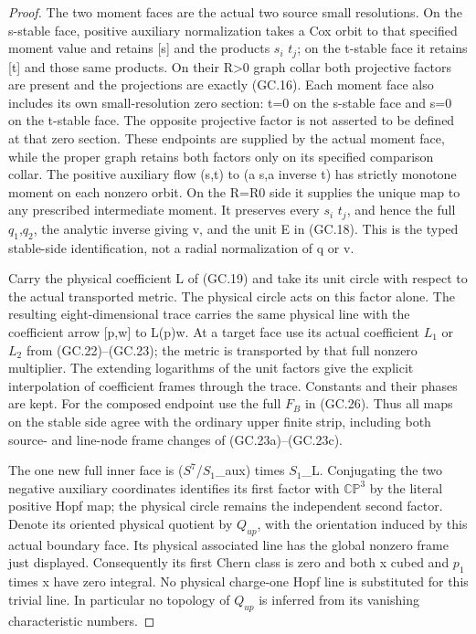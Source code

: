 \begin{proof}
The two moment faces are the actual two source small resolutions.
On the s-stable face, positive auxiliary normalization takes a
Cox orbit to that specified moment value and retains {[}s{]} and the
products \(s_{i}\) \(t_{j}\); on the t-stable face it retains {[}t{]} and those
same products. On their R\textgreater0 graph collar both projective factors
are present and the projections are exactly (GC.16). Each moment
face also includes its own small-resolution zero section: t=0
on the s-stable face and s=0 on the t-stable face. The opposite
projective factor is not asserted to be defined at that zero
section. These endpoints are supplied by the actual moment
face, while the proper graph retains both factors only on its
specified comparison collar. The positive auxiliary flow
(s,t) to (a s,a inverse t) has strictly monotone moment on each
nonzero orbit. On the R=R0 side it supplies the unique map to
any prescribed intermediate moment. It preserves every \(s_{i}\) \(t_{j}\),
and hence the full \(q_1\),\(q_2\), the analytic inverse giving v, and the
unit E in (GC.18). This is the typed stable-side identification,
not a radial normalization of q or v.

Carry the physical coefficient L of (GC.19) and take its unit
circle with respect to the actual transported metric. The physical
circle acts on this factor alone. The resulting eight-dimensional
trace carries the same physical line with the coefficient arrow
{[}p,w{]} to L(p)w. At a target face use its actual coefficient
\(L_1\) or \(L_2\) from (GC.22)--(GC.23); the metric is transported by
that full nonzero multiplier. The extending logarithms of the
unit factors give the explicit interpolation of coefficient
frames through the trace. Constants and their phases are kept.
For the composed endpoint use the full \(F_{B}\) in (GC.26).
Thus all maps on the stable side agree with the ordinary upper
finite strip, including both source- and line-node frame changes
of (GC.23a)--(GC.23c).

The one new full inner face is (\(S^7\)/\(S_1\)\_aux) times \(S_1\)\_L. Conjugating
the two negative auxiliary coordinates identifies its first
factor with \(\mathbb{CP}^3\) by the literal positive Hopf map; the physical
circle remains the independent second factor. Denote its oriented
physical quotient by \(Q_{up}\), with the orientation induced by this
actual boundary face. Its physical associated line has the global
nonzero frame just displayed. Consequently its first Chern class
is zero and both x cubed and \(p_1\) times x have zero integral.
No physical charge-one Hopf line is substituted for this trivial
line. In particular no topology of \(Q_{up}\) is inferred from its
vanishing characteristic numbers.


\end{proof}
